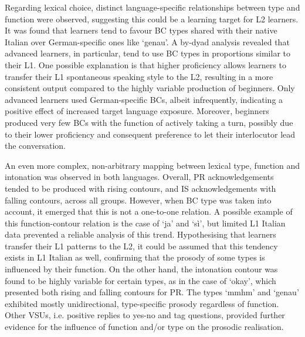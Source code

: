 \begin{styleStandard}
Regarding lexical choice, distinct language-specific relationships between type and function were observed, suggesting this could be a learning target for L2 learners. It was found that learners tend to favour BC types shared with their native Italian over German-specific ones like ‘genau’. A by-dyad analysis revealed that advanced learners, in particular, tend to use BC types in proportions similar to their L1. One possible explanation is that higher proficiency allows learners to transfer their L1 spontaneous speaking style to the L2, resulting in a more consistent output compared to the highly variable production of beginners. Only advanced learners used German-specific BCs, albeit infrequently, indicating a positive effect of increased target language exposure. Moreover, beginners produced very few BCs with the function of actively taking a turn, possibly due to their lower proficiency and consequent preference to let their interlocutor lead the conversation.
\end{styleStandard}

\begin{styleStandard}
An even more complex, non-arbitrary mapping between lexical type, function and intonation was observed in both languages. Overall, PR acknowledgements tended to be produced with rising contours, and IS acknowledgements with falling contours, across all groups. However, when BC type was taken into account, it emerged that this is not a one-to-one relation. A possible example of this function-contour relation is the case of ‘ja’ and ‘sì’, but limited L1 Italian data prevented a reliable analysis of this trend. Hypothesising that learners transfer their L1 patterns to the L2, it could be assumed that this tendency exists in L1 Italian as well, confirming that the prosody of some types is influenced by their function. On the other hand, the intonation contour was found to be highly variable for certain types, as in the case of ‘okay’, which presented both rising and falling contours for PR. The types ‘mmhm’ and ‘genau’ exhibited mostly unidirectional, type-specific prosody regardless of function. Other VSUs, i.e. positive replies to yes-no and tag questions, provided further evidence for the influence of function and/or type on the prosodic realisation.
\end{styleStandard}


